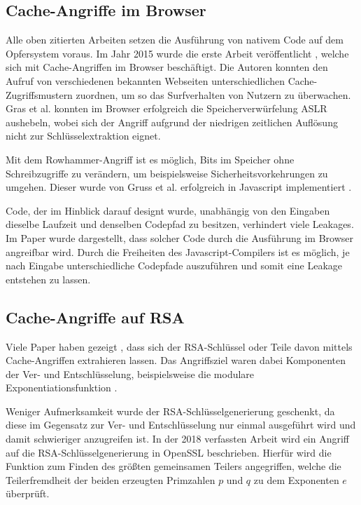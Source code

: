 \subsection{Cache-Angriffe im Browser}

Alle oben zitierten Arbeiten setzen die Ausführung von nativem Code auf dem Opfersystem voraus. Im Jahr 2015 wurde die erste Arbeit veröffentlicht \cite{TheSpyInTheSandbox}, welche sich mit Cache-Angriffen im Browser beschäftigt.
Die Autoren konnten den Aufruf von verschiedenen bekannten Webseiten unterschiedlichen Cache-Zugriffsmustern zuordnen, um so das Surfverhalten von Nutzern zu überwachen.
Gras et al. \cite{ASLROnTheLine} konnten im Browser erfolgreich die Speicherverwürfelung ASLR aushebeln, wobei sich der Angriff aufgrund der niedrigen zeitlichen Auflösung nicht zur Schlüsselextraktion eignet.

Mit dem Rowhammer-Angriff \cite{Rowhammer} ist es möglich, Bits im Speicher ohne Schreibzugriffe zu verändern, um beispielsweise Sicherheitsvorkehrungen zu umgehen. 
Dieser wurde von Gruss et al. erfolgreich in Javascript implementiert \cite{RowhammerJS}.

Code, der im Hinblick darauf designt wurde, unabhängig von den Eingaben dieselbe Laufzeit und denselben Codepfad zu besitzen, verhindert viele Leakages.
Im Paper \cite{DriveByPaper} wurde dargestellt, dass solcher Code durch die Ausführung im Browser angreifbar wird.
Durch die Freiheiten des Javascript-Compilers ist es möglich, je nach Eingabe unterschiedliche Codepfade auszuführen und somit eine Leakage entstehen zu lassen.

\subsection{Cache-Angriffe auf RSA}

Viele Paper haben gezeigt \cite{CacheBleedOpenSSLRSA, FlushReload, DriveByPaper}, dass sich der RSA-Schlüssel oder Teile davon mittels Cache-Angriffen extrahieren lassen. Das Angriffsziel waren dabei Komponenten der Ver- und Entschlüsselung, beispielsweise die modulare Exponentiationsfunktion \cite{CacheBleedOpenSSLRSA, DriveByPaper, DriveByPaper}. 


Weniger Aufmerksamkeit wurde der RSA-Schlüsselgenerierung geschenkt, da diese im Gegensatz zur Ver- und Entschlüsselung nur einmal ausgeführt wird und damit schwieriger anzugreifen ist.
In der 2018 verfassten Arbeit \cite{RSAKeyGeneration2} wird ein Angriff auf die RSA-Schlüsselgenerierung in OpenSSL beschrieben.
Hierfür wird die Funktion zum Finden des größten gemeinsamen Teilers angegriffen, welche die Teilerfremdheit der beiden erzeugten Primzahlen $p$ und $q$ zu dem Exponenten $e$ überprüft.

